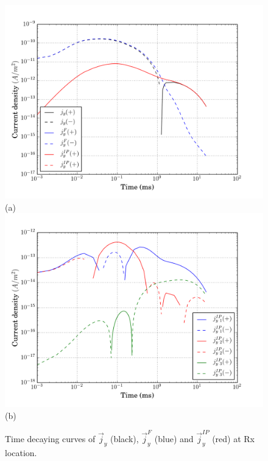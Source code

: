 \documentclass[a4paper, 11pt]{article}
\renewcommand {\j}  { {\vec j} }
\begin{document}
\begin{figure}[htb]
  \centering
  \includegraphics[height=0.4\textheight]{figures/synthetic/CurrentIP_case2_decay.png} \\
  (a) \\
  \includegraphics[height=0.4\textheight]{figures/synthetic/CurrentIP_decay_case2_2.png} \\
  (b)
  \caption{Time decaying curves of $\j_y$ (black), $\j^F_y$ (blue) and $\j^{IP}_y$ (red) at Rx location.}
  \label{F: currentEMIP_case2_decay}
\end{figure}
\end{document}
